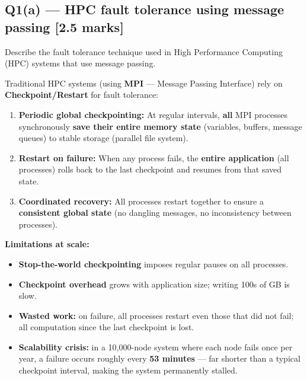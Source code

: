 \documentclass[12pt, a4paper]{article}
\newenvironment{qbox}{\begin{mdframed}[style=qframe]}{\end{mdframed}}
\newenvironment{solbox}{\begin{mdframed}[style=solframe]}{\end{mdframed}}
\newcommand{\qmarks}[1]{\hfill\textbf{\color{orange!70!black}[#1 marks]}}
\begin{document}
\subsection{Q1(a) --- HPC fault tolerance using message passing
  \texorpdfstring{\qmarks{2.5}}{}}
\begin{qbox}Describe the fault tolerance technique used in High Performance Computing (HPC)
systems that use message passing.\end{qbox}
\begin{solbox}
Traditional HPC systems (using \textbf{MPI} --- Message Passing Interface) rely on
\textbf{Checkpoint/Restart} for fault tolerance:

\begin{enumerate}[leftmargin=1.6cm, itemsep=3pt]
  \item \textbf{Periodic global checkpointing:} At regular intervals, \textbf{all} MPI processes
    synchronously \textbf{save their entire memory state} (variables, buffers, message queues) to
    stable storage (parallel file system).
  \item \textbf{Restart on failure:} When any process fails, the \textbf{entire application}
    (all processes) rolls back to the last checkpoint and resumes from that saved state.
  \item \textbf{Coordinated recovery:} All processes restart together to ensure a
    \textbf{consistent global state} (no dangling messages, no inconsistency between processes).
\end{enumerate}

\textbf{Limitations at scale:}
\begin{itemize}[leftmargin=1.4cm, itemsep=1pt]
  \item \textbf{Stop-the-world checkpointing} imposes regular pauses on all processes.
  \item \textbf{Checkpoint overhead} grows with application size; writing 100s of GB is
    slow.
  \item \textbf{Wasted work:} on failure, all processes restart even those that did not fail;
    all computation since the last checkpoint is lost.
  \item \textbf{Scalability crisis:} in a 10,000-node system where each node fails once
    per year, a failure occurs roughly every \textbf{53 minutes} --- far shorter than a
    typical checkpoint interval, making the system permanently stalled.
\end{itemize}
\end{solbox}
\end{document}
